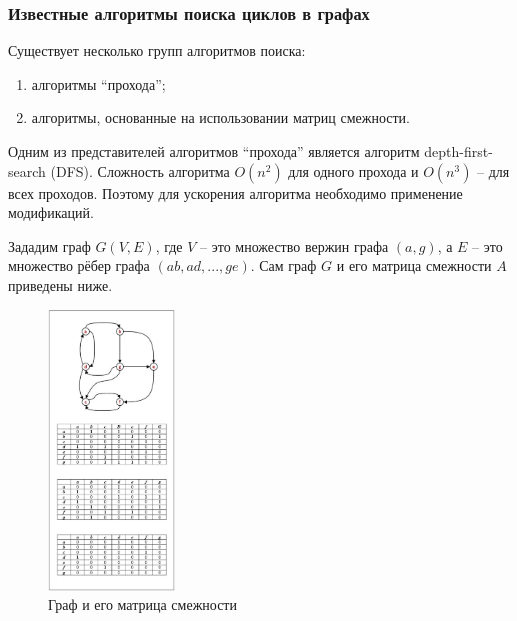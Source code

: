 \def\notedate{2021.11.14}
\def\currentauthor{Муха В. (РК6-73Б)}

\subsubsection{Известные алгоритмы поиска циклов в графах}



Существует несколько групп алгоритмов поиска\cite{davidrajuh2016}:
\begin{enumerate}[label=\arabic*)]
    \item алгоритмы ``прохода'';
    \item алгоритмы, основанные на использовании матриц смежности.
\end{enumerate}

Одним из представителей алгоритмов ``прохода'' является алгоритм depth-first-search (DFS). Сложность алгоритма $O(n^2)$ для одного прохода и $O(n^3)$ -- для всех проходов. Поэтому для ускорения алгоритма необходимо применение модификаций\cite{Mahdi2011}. 

Зададим граф $G(V, E)$, где $V$ -- это множество вержин графа $(a, g)$, а $E$ -- это множество рёбер графа $(ab, ad, ... , ge)$. Сам граф $G$ и его матрица смежности $A$ приведены ниже.

\begin{figure}[H]
	\centering
	\includegraphics[width=0.3\textwidth]{ResearchNotes/rndhpc_not_edt_2021_11_14/adj_matrix.png}
	\caption{Граф и его матрица смежности} 
\end{figure}

